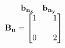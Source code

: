 \documentclass[preview]{standalone}
\begin{document}
\begin{align*}
\begin{array}{c}\begin{matrix}\hspace{1cm} \mathbf{b_{n_x}}  & \mathbf{b_{n_y}} \hspace{0.6cm} \end{matrix} \\ \mathbf{B_n} = \begin{bmatrix} 1 & \quad 1 \\ \\0 &  \quad 2 \end{bmatrix} \end{array}
\end{align*}
\end{document}
